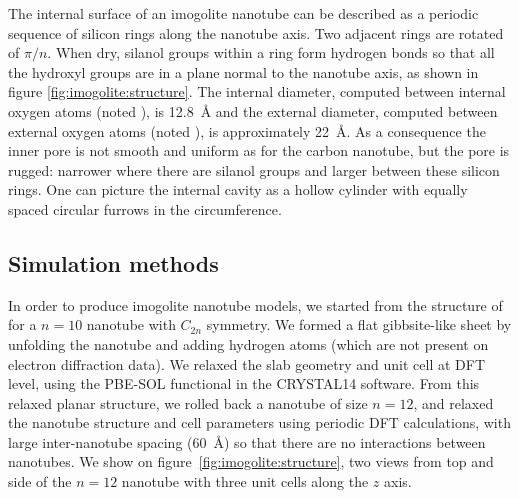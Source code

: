 \documentclass[thesis]{subfiles}
\begin{document}
The internal surface of an imogolite nanotube can be described as a periodic
sequence of silicon rings along the nanotube axis. Two adjacent rings are
rotated of $\pi / n$. When dry, silanol groups within a ring form hydrogen bonds
so that all the hydroxyl groups are in a plane normal to the nanotube axis, as
shown in figure \ref{fig:imogolite:structure}. The internal diameter, computed
between internal oxygen atoms (noted ), is \SI{12.8}{\AA} and the
external diameter, computed between external oxygen atoms (noted ),
is approximately \SI{22}{\AA}. As a consequence the inner pore is not smooth and
uniform as for the carbon nanotube, but the pore is rugged: narrower where there
are silanol groups and larger between these silicon rings. One can picture the
internal cavity as a hollow cylinder with equally spaced circular furrows in the
circumference.


\subsection{Simulation methods}

In order to produce imogolite nanotube models, we started from the structure of
\citeauthor{Cradwick1972}\cite{Cradwick1972} for a $n=10$ nanotube with $C_{2n}$
symmetry. We formed a flat gibbsite-like sheet by unfolding the nanotube and
adding hydrogen atoms (which are not present on electron diffraction data). We
relaxed the slab geometry and unit cell at DFT level, using the PBE-SOL
functional in the CRYSTAL14 software. From this relaxed planar structure, we
rolled back a nanotube of size $n=12$, and relaxed the nanotube structure and
cell parameters using periodic DFT calculations, with large inter-nanotube
spacing (\SI{60}{\AA}) so that there are no interactions between nanotubes. We
show on figure~\ref{fig:imogolite:structure}, two views from top and side of the
$n=12$ nanotube with three unit cells along the $z$ axis.
\end{document}
